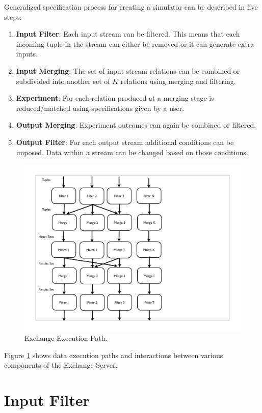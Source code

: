 \documentclass{article}
\begin{document}
Generalized specification process for creating a simulator can be described in five steps:

\begin{enumerate}
    \item {\bf Input Filter}: Each input stream can be filtered. This means that each incoming tuple in the stream can either be removed or it can generate extra inputs. 
    \item {\bf Input Merging}: The set of input stream relations can be combined or subdivided into another set of $K$ relations using merging and filtering. 
    \item {\bf Experiment}: For each relation produced at a merging stage is reduced/matched using specifications given by a user.
    \item {\bf Output Merging}: Experiment outcomes can again be combined or filtered.
    \item {\bf Output Filter}: For each output stream additional conditions can be imposed. Data within a stream can be changed based on those conditions.
\end{enumerate}

\begin{figure}
  \includegraphics[width=4.50in]{figures/ExchangeFigure.pdf}
  \caption{Exchange Execution Path.}
  \label{fig:overview}
\end{figure}

Figure \ref{fig:overview} shows data execution paths and interactions between various components of the Exchange Server.

\section{Input Filter}
\end{document}
